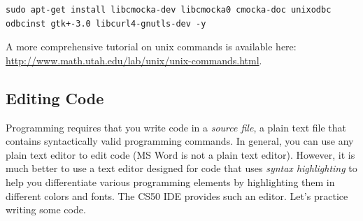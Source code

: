 \documentclass[12pt]{scrartcl}
\begin{document}
\begin{verbatim}
sudo apt-get install libcmocka-dev libcmocka0 cmocka-doc unixodbc 
odbcinst gtk+-3.0 libcurl4-gnutls-dev -y
\end{verbatim}

A more comprehensive tutorial on unix commands is available here: 
\url{http://www.math.utah.edu/lab/unix/unix-commands.html}.

\subsection{Editing Code}

Programming requires that you write code in a \emph{source file}, 
a plain text file that contains syntactically valid programming 
commands.  In general, you can use any plain text editor to edit
code (MS Word is not a plain text editor).  However, it is much
better to use a text editor designed for code that uses 
\emph{syntax highlighting} to help you differentiate various programming elements
by highlighting them in different colors and fonts.  The CS50 IDE
provides such an editor.  Let's practice writing some code.
\end{document}
